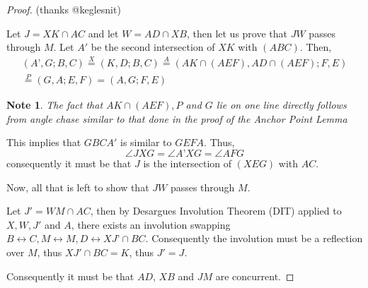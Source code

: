 \documentclass{article}
\newtheorem{note}{Note}
\begin{document}
\begin{proof}
  (thanks @keglesnit)

  Let \(J = XK \cap AC\) and let \(W = AD \cap XB\), then let us prove that \(JW\) passes through \(M\). Let \(A'\) be the second intersection of \(XK\) with \((ABC)\). Then,
  \begin{multline*}
  (A’,G;B,C)\overset{X}{=}(K,D;B,C)\overset{A}{=}(AK\cap(AEF), AD\cap(AEF);F,E)
  \\ \overset{P}{=}(G,A;E,F)=(A,G;F,E)
  \end{multline*}
  \begin{note}
    The fact that \(AK \cap (AEF), P\) and \(G\) lie on one line directly follows from angle chase similar to that done in the proof of the Anchor Point Lemma
  \end{note}
  This implies that \(GBCA'\) is similar to \(GEFA\). Thus,
  \[\angle JXG=\angle A’XG=\angle AFG\]
  consequently it must be that \(J\) is the intersection of \((XEG)\) with \(AC\).

  Now, all that is left to show that \(JW\) passes through \(M\).

  Let \(J' = WM \cap AC\), then by Desargues Involution Theorem (DIT) applied to \(X, W, J'\) and \(A\), there exists an involution swapping \(B \leftrightarrow C, M \leftrightarrow M, D \leftrightarrow XJ’\cap BC\). Consequently the involution must be a reflection over \(M\), thus \(XJ' \cap BC = K\), thus \(J' = J\).

  Consequently it must be that \(AD\), \(XB\) and \(JM\) are concurrent.
\end{proof}
\end{document}
